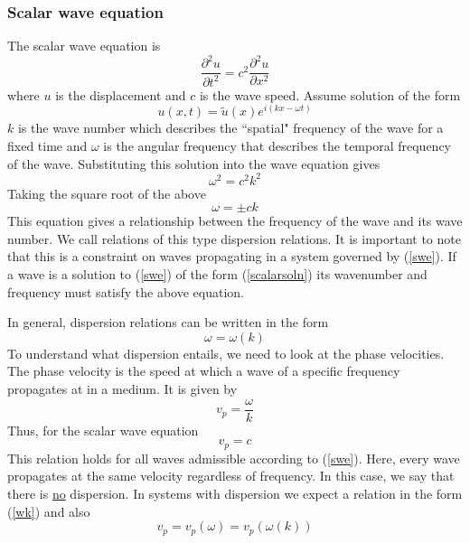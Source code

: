 \documentclass{article}
\begin{document}
\subsubsection{Scalar wave equation}
The scalar wave equation is 
\begin{equation} \label{swe}
\frac{\partial^2 u}{\partial t^2} = c^2 \frac{\partial^2 u}{\partial x^2}
\end{equation}
where $u$ is the displacement and $c$ is the wave speed. Assume solution of 
the form
\begin{equation} \label{scalarsoln}
u(x,t) = \tilde{u}(x)e^{i(kx - \omega t)}
\end{equation}
$k$ is the wave number which describes the ``spatial" frequency of 
the wave for a fixed time and $\omega$ is the angular frequency that describes 
the temporal frequency of the wave. Substituting this solution into the wave 
equation gives
\begin{equation}
\omega^2 = c^2 k^2
\end{equation}
Taking the square root of the above
\begin{equation} \label{nd}
\omega = \pm c k
\end{equation}
This equation gives a relationship between the frequency of the wave and its 
wave number. We call relations of this type dispersion relations. It is 
important to note that this is a constraint on waves propagating in a system 
governed by (\ref{swe}). If a wave is a solution to (\ref{swe}) of the form 
(\ref{scalarsoln}) its wavenumber and frequency must satisfy the above equation.

In general, dispersion relations can be written in the form
\begin{equation} \label{wk}
\omega = \omega(k)
\end{equation}
To understand what dispersion entails, we need to look at the phase velocities. 
The phase velocity is the speed at which a wave of a specific frequency 
propagates at in a medium. It is given by
\begin{equation}
v_p = \frac{\omega}{k}
\end{equation}
Thus, for the scalar wave equation 
\begin{equation}
v_p = c
\end{equation}
This relation holds for all waves admissible according to (\ref{swe}). Here, 
every wave propagates at the same velocity regardless of frequency. In this 
case, we say that there is \underline{no} dispersion. In systems with 
dispersion we expect a relation in the form (\ref{wk}) and also
\begin{equation}
v_p = v_p(\omega) = v_p(\omega(k))
\end{equation}
\end{document}
